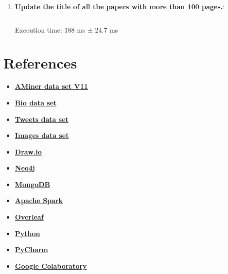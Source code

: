 \documentclass{Configuration_Files/PoliMi3i_thesis}
\begin{document}
\begin{enumerate}
    \item \textbf{Update the title of all the papers with more than 100 pages.}:
    \inputminted[linenos,tabsize=2,breaklines]{Python}{code/commands_spark/cmd_5.txt}
    Execution time: 188 ms ± 24.7 ms
    \begin{figure}[H]
        \centering
    \end{figure} 

\end{enumerate}

\chapter{References}
\label{ch:references}
\begin{itemize}
    \item \textbf{\href{https://www.AMiner.org/citation}{AMiner data set V11}}
    \item \textbf{\href{https://www.kaggle.com/datasets/choobani/goodread-authors}{Bio data set}}
    \item \textbf{\href{https://transparency.twitter.com/en/reports/moderation-research.html}{Tweets data set}}
    \item \textbf{\href{https://huggingface.co/datasets/conceptual_captions/commit/0477f735cc48e10c43ef55b9b2ca67fce3d45314\#d2h-548657}{Images data set}}
    \item \textbf{\href{https://app.diagrams.net/}{Draw.io}}
    \item \textbf{\href{https://neo4j.com/}{Neo4j}}
    \item \textbf{\href{https://www.mongodb.com/}{MongoDB}}
    \item \textbf{\href{https://spark.apache.org/}{Apache Spark}}
    \item \textbf{\href{https://www.overleaf.com/}{Overleaf}}
    \item \textbf{\href{https://www.python.org/}{Python}}
    \item \textbf{\href{https://www.jetbrains.com/pycharm/}{PyCharm}}
    \item \textbf{\href{https://colab.research.google.com/}{Google Colaboratory}}
\end{itemize}
\end{document}
